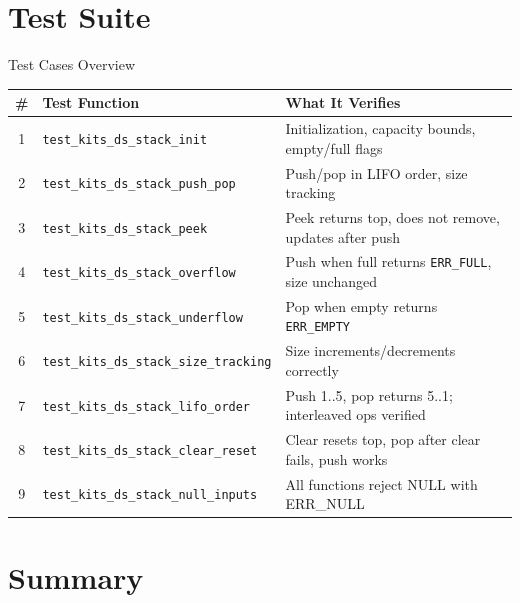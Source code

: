 \documentclass[aspectratio=169, 10pt]{beamer}
\begin{document}
\section{Test Suite}

\begin{frame}{Test Cases Overview}
\begin{table}
\centering
\small
\begin{tabular}{@{}clp{7cm}@{}}
\toprule
\textbf{\#} & \textbf{Test Function} & \textbf{What It Verifies} \\
\midrule
1 & \texttt{test\_kits\_ds\_stack\_init}
  & Initialization, capacity bounds, empty/full flags \\
2 & \texttt{test\_kits\_ds\_stack\_push\_pop}
  & Push/pop in LIFO order, size tracking \\
3 & \texttt{test\_kits\_ds\_stack\_peek}
  & Peek returns top, does not remove, updates after push \\
4 & \texttt{test\_kits\_ds\_stack\_overflow}
  & Push when full returns \texttt{ERR\_FULL}, size unchanged \\
5 & \texttt{test\_kits\_ds\_stack\_underflow}
  & Pop when empty returns \texttt{ERR\_EMPTY} \\
6 & \texttt{test\_kits\_ds\_stack\_size\_tracking}
  & Size increments/decrements correctly \\
7 & \texttt{test\_kits\_ds\_stack\_lifo\_order}
  & Push 1..5, pop returns 5..1; interleaved ops verified \\
8 & \texttt{test\_kits\_ds\_stack\_clear\_reset}
  & Clear resets top, pop after clear fails, push works \\
9 & \texttt{test\_kits\_ds\_stack\_null\_inputs}
  & All functions reject NULL with ERR\_NULL \\
\bottomrule
\end{tabular}
\end{table}
\end{frame}

\section{Summary}
\end{document}
